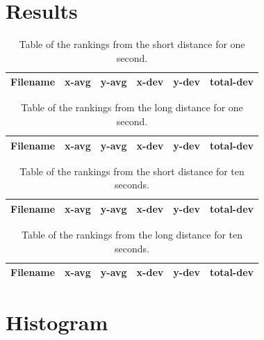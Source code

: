 \documentclass[10pt,letterpaper]{article}
\begin{document}
\section*{Results}
\begin{center}
\begin{table}[h!]
\centering
\begin{tabular}{|c|c|c|c|c|c|} 
 \hline
 Filename & x-avg & y-avg & x-dev & y-dev & total-dev \\ 
 \hline\hline
 
 \hline
\end{tabular}
\caption{Table of the rankings from the short distance for one second.}
\label{table:1}
\end{table}
\end{center}
\begin{center}
\begin{table}[h!]
\centering
\begin{tabular}{|c|c|c|c|c|c|} 
 \hline
 Filename & x-avg & y-avg & x-dev & y-dev & total-dev \\ 
 \hline\hline
 
 \hline
\end{tabular}
\caption{Table of the rankings from the long distance for one second.}
\label{table:2}
\end{table}
\end{center}
\begin{center}
\begin{table}[h!]
\centering
\begin{tabular}{|c|c|c|c|c|c|} 
 \hline
 Filename & x-avg & y-avg & x-dev & y-dev & total-dev \\ 
 \hline\hline
 
 \hline
\end{tabular}
\caption{Table of the rankings from the short distance for ten seconds.}
\label{table:3}
\end{table}
\end{center}
\begin{center}
\begin{table}[h!]
\centering
\begin{tabular}{|c|c|c|c|c|c|} 
 \hline
 Filename & x-avg & y-avg & x-dev & y-dev & total-dev \\ 
 \hline\hline
 
 \hline
\end{tabular}
\caption{Table of the rankings from the long distance for ten seconds.}
\label{table:4}
\end{table}
\end{center}
\clearpage
\section*{Histogram}
\end{document}
